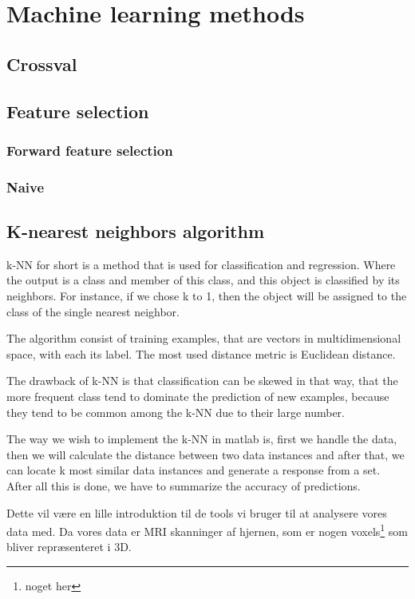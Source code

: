 \section{Machine learning methods}

\subsection{Crossval}

\subsection{Feature selection}

\subsubsection{Forward feature selection}

\subsubsection{Naive}



\subsection{K-nearest neighbors algorithm}

k-NN for short is a method that is used for classification and regression. Where the output is a class and member of this class, and this object is classified by its neighbors. For instance, if we chose k to 1, then the object will be assigned to the class of the single nearest neighbor.

The algorithm consist of training examples, that are vectors in multidimensional space, with each its label. The most used distance metric is Euclidean distance.

The drawback of k-NN is that classification can be skewed in that way, that the more frequent class tend to dominate the prediction of new examples, because they tend to be common among the k-NN due to their large number.

The way we wish to implement the k-NN in matlab is, first we handle the data, then we will calculate the distance between two data instances and after that, we can locate k most similar data instances and generate a response from a set. After all this is done, we have to summarize the accuracy of predictions.


Dette vil være en lille introduktion til de tools vi bruger til at analysere vores data med. Da vores data er MRI skanninger af hjernen, som er nogen voxels\footnote{noget her} som bliver repræsenteret i 3D.\\



